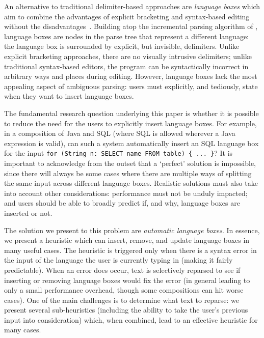 \documentclass[sigplan,screen]{acmart}\settopmatter{printfolios=true,printccs=false,printacmref=false}
\begin{document}
An alternative to traditional delimiter-based approaches are \emph{language boxes} which aim to
combine the advantages of explicit bracketing and syntax-based
editing without the disadvantages~\cite{diekmann14eco}. Building atop the
incremental parsing algorithm
of \citet{wagner98practicalalgorithms}, language boxes are nodes in the parse
tree that represent a different language: the language box is surrounded by
explicit, but invisible, delimiters. Unlike explicit bracketing approaches,
there are no visually intrusive delimiters; unlike traditional
syntax-based editors, the program can be syntactically incorrect in arbitrary
ways and places during editing. However, language boxes lack the most appealing aspect of
ambiguous parsing: users must explicitly, and tediously, state when they want
to insert language boxes.

The fundamental research question underlying this paper is whether it is
possible to reduce the need for the users to explicitly insert language
boxes. For example, in a composition of Java and SQL (where SQL is allowed
wherever a Java expression is valid), can such a system automatically insert an
SQL language box for the input \texttt{for (String n: SELECT name FROM table) \{ ...
\}}? It is important to acknowledge from the outset that a `perfect' solution
is impossible, since there will always be some cases where there are multiple
ways of splitting the same input across different language boxes. Realistic
solutions must also take into account other considerations: performance must
not be unduly impacted; and users should be able to broadly predict if, and
why, language boxes are inserted or not.

The solution we present to this problem are \emph{automatic language boxes}. In
essence, we present a heuristic which can insert, remove, and update language
boxes in many useful cases. The heuristic is triggered only when there is a
syntax error in the input of the language the user is currently typing in
(making it fairly predictable). When an error does occur, text is selectively
reparsed to see if inserting or removing language boxes would fix the error
(in general leading to only a small performance overhead, though some
compositions can hit worse cases). One of the main challenges is
to determine what text to reparse: we present several sub-heuristics (including
the ability to take the user's previous input into consideration) which, when
combined, lead to an effective heuristic for many cases. 
\end{document}
